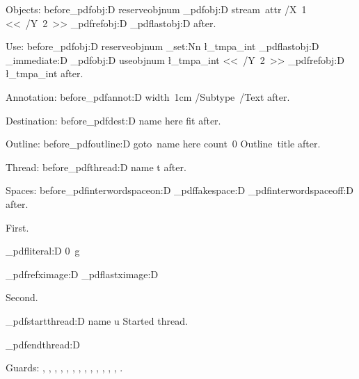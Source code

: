 \documentclass{article}
\begin{document}
Objects: before\ExplSyntaxOn \tex_pdfobj:D reserveobjnum
\tex_pdfobj:D stream~attr {/X~1} {<<~/Y~2~>>} \tex_pdfrefobj:D \tex_pdflastobj:D \ExplSyntaxOff{} after.

Use: before\ExplSyntaxOn \tex_pdfobj:D reserveobjnum
\int_set:Nn \l_tmpa_int { \tex_pdflastobj:D }
\tex_immediate:D \tex_pdfobj:D useobjnum \l_tmpa_int {<<~/Y~2~>>}
\tex_pdfrefobj:D \l_tmpa_int \ExplSyntaxOff{} after.

Annotation: before\ExplSyntaxOn \tex_pdfannot:D width~1cm {/Subtype~/Text} \ExplSyntaxOff{} after.

Destination: before\ExplSyntaxOn \tex_pdfdest:D name {here} fit \ExplSyntaxOff{} after.

Outline: before\ExplSyntaxOn \tex_pdfoutline:D goto~name {here} count~0 {Outline~title}
\ExplSyntaxOff{} after.

Thread: before\ExplSyntaxOn \tex_pdfthread:D name {t} \ExplSyntaxOff{} after.

Spaces: before\ExplSyntaxOn \tex_pdfinterwordspaceon:D \tex_pdffakespace:D
\tex_pdfinterwordspaceoff:D \ExplSyntaxOff{} after.

First.

\ExplSyntaxOn \tex_pdfliteral:D {0~g} \ExplSyntaxOff

\ExplSyntaxOn \tex_pdfrefximage:D \tex_pdflastximage:D \ExplSyntaxOff

Second.

\ExplSyntaxOn \tex_pdfstartthread:D name {u} \ExplSyntaxOff
Started thread.\par
\ExplSyntaxOn \tex_pdfendthread:D \ExplSyntaxOff

Guards: , , ,
, , ,
, ,
, , ,
, , .
\end{document}
